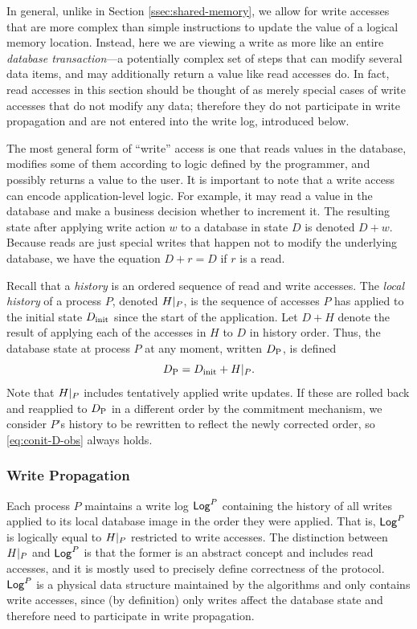 \documentclass[]             %
{NASA}                       %
\theoremstyle{definition}
\begin{document}
In general, unlike in Section \ref{ssec:shared-memory}, we allow for
write accesses that are more complex than simple instructions to
update the value of a logical memory location. Instead, here we are
viewing a write as more like an entire \emph{database transaction}---a
potentially complex set of steps that can modify several data items,
and may additionally return a value like read accesses do. In fact,
read accesses in this section should be thought of as merely special
cases of write accesses that do not modify any data; therefore they do
not participate in write propagation and are not entered into the
write log, introduced below.

The most general form of ``write'' access is one that reads values in
the database, modifies some of them according to logic defined by the
programmer, and possibly returns a value to the user. It is important
to note that a write access can encode application-level logic. For
example, it may read a value in the database and make a business
decision whether to increment it. The resulting state after applying
write action $w$ to a database in state $D$ is denoted $D +
w$. Because reads are just special writes that happen not to modify
the underlying database, we have the equation $D + r = D$ if $r$ is a
read.

Recall that a \emph{history} is an ordered sequence of read and write
accesses. The \emph{local history} of a process $P$, denoted
$H|_{P}$, is the sequence of accesses $P$ has applied to the
initial state $D_\textrm{init}$ since the start of the application. Let $D + H$
denote the result of applying each of the accesses in $H$ to $D$ in
history order. Thus, the database state at process $P$ at any moment,
written $D_{\textrm{P}}$, is defined
\begin{equation}
  D_{\textrm{P}} = D_\textrm{init} + H|_{P}. \label{eq:conit-D-obs}
\end{equation}
Note that $H|_{P}$ includes tentatively applied write
updates. If these are rolled back and reapplied to $D_{\textrm{P}}$ in a
different order by the commitment mechanism, we consider $P$'s history
to be rewritten to reflect the newly corrected order, so
\eqref{eq:conit-D-obs} always holds.

\subsubsection{Write Propagation}
\label{sssec:conit-write-propagation}

Each process $P$ maintains a write log $\mathsf{Log}^{P}$ containing the history
of all writes applied to its local database image in the order they
were applied. That is, $\mathsf{Log}^{P}$ is logically equal to
$H|_{P}$ restricted to write accesses. The distinction
between $H|_{P}$ and $\mathsf{Log}^{P}$ is that the former is an
abstract concept and includes read accesses, and it is mostly used to
precisely define correctness of the protocol. $\mathsf{Log}^{P}$ is a physical
data structure maintained by the algorithms and only contains write
accesses, since (by definition) only writes affect the database state
and therefore need to participate in write propagation.
\end{document}
